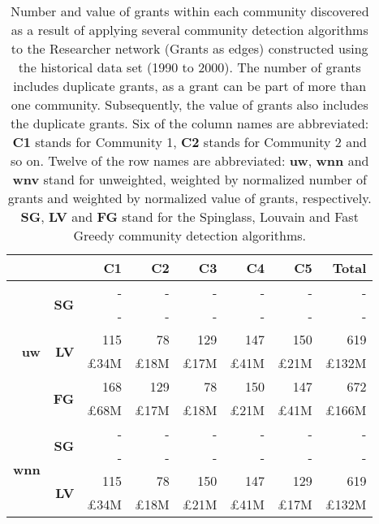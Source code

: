 \begin{table}[!htbp]
\centering
\caption[Number and value of grants within each community discovered in the Researcher network (Grants as edges) constructed using the historical data set (1990 to 2000)]{Number and value of grants within each community discovered as a result of applying several community detection algorithms to the Researcher network (Grants as edges) constructed using the historical data set (1990 to 2000). The number of grants includes duplicate grants, as a grant can be part of more than one community. Subsequently, the value of grants also includes the duplicate grants. Six of the column names are abbreviated: \textbf{C1} stands for Community 1, \textbf{C2} stands for Community 2 and so on. Twelve of the row names are abbreviated: \textbf{uw}, \textbf{wnn} and \textbf{wnv} stand for unweighted, weighted by normalized number of grants and weighted by normalized value of grants, respectively. \textbf{SG}, \textbf{LV} and \textbf{FG} stand for the Spinglass, Louvain and Fast Greedy community detection algorithms.}
\label{table:research_b_past2_grants1_appendix}
\begin{tabular}{r|r|r|r|r|r|r|r}
\multicolumn{2}{c|}{} & \textbf{C1} & \textbf{C2} & \textbf{C3} & \textbf{C4} & \textbf{C5} & \textbf{Total}\\
\hline
\multirow{6}{*}{\textbf{uw}}
& \multirow{2}{*}{\textbf{SG}}
& {-} & {-} & {-} & {-} & {-} & {-}\\
& {} & {-} & {-} & {-} & {-} & {-} & {-}\\
\cline{2-8}
& \multirow{2}{*}{\textbf{LV}}
& {115} & {78} & {129} & {147} & {150} & {619}\\
& {} & {\pounds34M} & {\pounds18M} & {\pounds17M} & {\pounds41M} & {\pounds21M} & {\pounds132M}\\
\cline{2-8}
& \multirow{2}{*}{\textbf{FG}}
& {168} & {129} & {78} & {150} & {147} & {672}\\
& {} & {\pounds68M} & {\pounds17M} & {\pounds18M} & {\pounds21M} & {\pounds41M} & {\pounds166M}\\
\hline
\multirow{6}{*}{\textbf{wnn}}
& \multirow{2}{*}{\textbf{SG}}
& {-} & {-} & {-} & {-} & {-} & {-}\\
& {} & {-} & {-} & {-} & {-} & {-} & {-}\\
\cline{2-8}
& \multirow{2}{*}{\textbf{LV}}
& {115} & {78} & {150} & {147} & {129} & {619}\\
& {} & {\pounds34M} & {\pounds18M} & {\pounds21M} & {\pounds41M} & {\pounds17M} & {\pounds132M}\\

\end{tabular}
\end{table}

